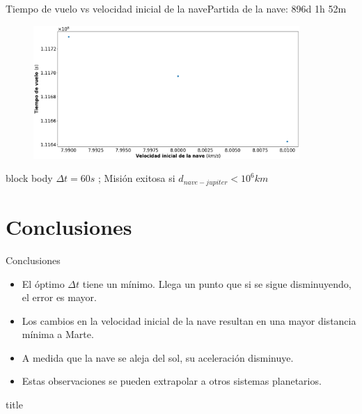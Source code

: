 \documentclass{beamer}
\begin{document}
            \begin{frame}{Tiempo de vuelo vs velocidad inicial de la nave}{Partida de la nave: 896d 1h 52m}
                \begin{figure}[H!]
                    \includegraphics[width=0.9\textwidth]{./travel_time_vs_v0_logarithmic_jupiter}
                    \label{fig:jupiter_7}
                \end{figure}
                \begin{beamercolorbox}[sep=5pt,center]{block body}
                    \centering
                    \small{$\Delta t = 60s$ ; Misión exitosa si $d_{nave-jupiter} < 10^6 km$}
                \end{beamercolorbox}
            \end{frame}

    \section{Conclusiones}

        \begin{frame}{Conclusiones}
            \begin{itemize}
                \item El óptimo $\Delta t$ tiene un mínimo.
                Llega un punto que si se sigue disminuyendo, el error es mayor.
                \item Los cambios en la velocidad inicial de la nave resultan en una mayor distancia mínima a Marte.
                \item A medida que la nave se aleja del sol, su aceleración disminuye.
                \item Estas observaciones se pueden extrapolar a otros sistemas planetarios.
            \end{itemize}
        \end{frame}

        \begin{frame}
            \begin{beamercolorbox}[sep=8pt,center]{title}
            \end{beamercolorbox}
        \end{frame}
\end{document}
